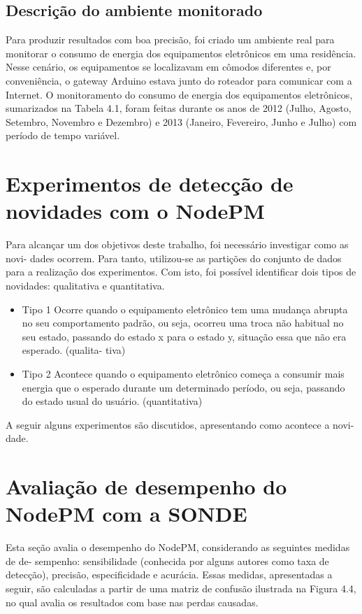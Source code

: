 \subsection{Descrição do ambiente monitorado}
Para produzir resultados com boa precisão, foi criado um ambiente real para monitorar o consumo de energia dos equipamentos eletrônicos em uma residência. Nesse cenário, os equipamentos se localizavam em cômodos diferentes e, por conveniência, o gateway Arduino estava junto do roteador para comunicar com a Internet. O monitoramento do consumo de energia dos equipamentos eletrônicos, sumarizados na Tabela 4.1, foram feitas durante os anos de 2012 (Julho, Agosto, Setembro, Novembro e Dezembro) e 2013 (Janeiro, Fevereiro, Junho e Julho) com período de tempo variável.


\section{Experimentos de detecção de novidades com o NodePM}
Para alcançar um dos objetivos deste trabalho, foi necessário investigar como as novi- dades ocorrem. Para tanto, utilizou-se as partições do conjunto de dados para a realização dos experimentos. Com isto, foi possível identificar dois tipos de novidades: qualitativa e quantitativa.

\begin{itemize}
	\item{Tipo 1} Ocorre quando o equipamento eletrônico tem uma mudança abrupta no seu comportamento padrão, ou seja, ocorreu uma troca não habitual no seu estado, passando do estado x para o estado y, situação essa que não era esperado. (qualita- tiva)
	\item{Tipo 2} Acontece quando o equipamento eletrônico começa a consumir mais energia que o esperado durante um determinado período, ou seja, passando do estado usual do usuário. (quantitativa)
\end{itemize}


A seguir alguns experimentos são discutidos, apresentando como acontece a novi- dade.


\section{Avaliação de desempenho do NodePM com a SONDE}
Esta seção avalia o desempenho do NodePM, considerando as seguintes medidas de de- sempenho: sensibilidade (conhecida por alguns autores como taxa de detecção), precisão, especificidade e acurácia. Essas medidas, apresentadas a seguir, são calculadas a partir de uma matriz de confusão ilustrada na Figura 4.4, no qual avalia os resultados com base nas perdas causadas.